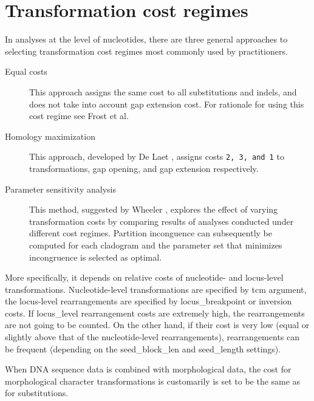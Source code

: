 \section{Transformation cost regimes}
In analyses at the level of nucleotides, there are three general approaches to selecting transformation cost regimes most commonly used by \poy practitioners.
\begin{description}
\item[Equal costs] This approach assigns the same cost to all substitutions and indels, and does not take into account gap extension cost. For rationale for using this cost regime see Frost et al. \cite{frost2001} %
\item[Homology maximization] This approach, developed by De Laet \cite{delaet2005}, assigns costs \texttt{2, 3, and 1} to transformations, gap opening, and gap extension respectively. %
\item[Parameter sensitivity analysis] This method, suggested by Wheeler \cite{wheeler1995}, explores the effect of varying transformation costs by comparing results of analyses conducted under different cost regimes. Partition inconguence can subsequently be computed  for each cladogram and the parameter set that minimizes incongruence is selected as optimal. %
\end{description}
More specifically, it depends on relative costs of nucleotide- and locus-level transformations. Nucleotide-level transformations are specified by tcm argument, the locus-level rearrangements are specified by locus\_breakpoint or inversion costs. If locus\_level rearrangement costs are extremely high, the rearrangements are not going to be counted. On the other hand, if their cost is very low (equal or slightly above that of the nucleotide-level rearrangements), rearrangements can be frequent (depending on the seed\_block\_len and seed\_length settings).

When DNA sequence data is combined with morphological data, the cost for morphological character transformations is customarily is set to be the same as for substitutions.

